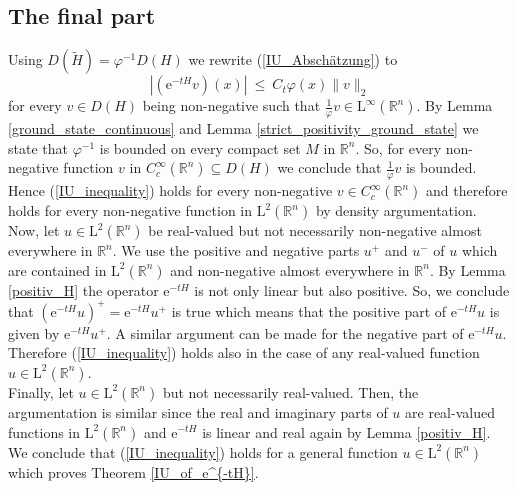 \documentclass[12pt,longbibliography]{article}
\def\R{\mathbb{R}}
\theoremstyle{definition}
\theoremstyle{remark}
\theoremstyle{example}
\begin{document}
\subsection{The final part}

Using $D(\tilde{H}) = \varphi^{-1} D(H)$ we rewrite (\ref{IU_Abschätzung}) to 
\begin{equation}\label{IU_inequality}
\left| \left( \mathrm{e}^{-tH} v \right) (x) \right| \ \leq \ C_{t} \varphi(x) \| v \|_{2}
\end{equation}
for every $v \in D(H)$ being non-negative such that $\frac{1}{\varphi} v \in \mathrm{L}^{\infty}(\mathbb{R}^{n})$. 
By Lemma \ref{ground_state_continuous} and Lemma \ref{strict_positivity_ground_state} 
we state that $\varphi^{-1}$ is bounded on every compact
set $M$ in $\R^{n}$. So, for every non-negative function $v$ in $C_{c}^{\infty}(\R^{n}) \subseteq D(H)$ 
we conclude that  $\frac{1}{\varphi} v$ is bounded. Hence (\ref{IU_inequality})
holds for every non-negative $v \in C_{c}^{\infty}(\R^{n})$ and therefore holds for every non-negative function
in $\mathrm{L}^{2}(\R^{n})$ by density argumentation.\\

Now, let $u \in \mathrm{L}^{2}(\R^{n})$ be real-valued but not necessarily non-negative almost everywhere in $\R^{n}$. 
We use the positive and negative parts $u^{+}$ and $u^{-}$ of $u$ which are contained  in $\mathrm{L}^{2}(\R^{n})$
and non-negative almost everywhere in $\R^{n}$. By Lemma \ref{positiv_H} the operator $\mathrm{e}^{-tH}$ is
not only linear but also positive. So, we conclude that
$\left( \mathrm{e}^{-tH}u \right)^{+} = \mathrm{e}^{-tH}u^{+}$
is true which means that the positive part of $ \mathrm{e}^{-tH}u$ is given by $\mathrm{e}^{-tH}u^{+}$. 
A similar argument can be made for the negative part of $ \mathrm{e}^{-tH}u$. Therefore (\ref{IU_inequality}) holds 
also in the case of any real-valued function $u \in \mathrm{L}^{2}(\R^{n})$.\\

Finally, let $u \in \mathrm{L}^{2}(\R^{n})$ but not necessarily real-valued. Then, the argumentation is similar  
since the real and imaginary parts of $u$ are real-valued functions in $\mathrm{L}^{2}(\R^{n})$ and 
$\mathrm{e}^{-tH}$ is linear and real again by Lemma \ref{positiv_H}. We conclude that 
(\ref{IU_inequality}) holds for a general function $u \in \mathrm{L}^{2}(\R^{n})$ which proves Theorem \ref{IU_of_e^{-tH}}.
\end{document}
